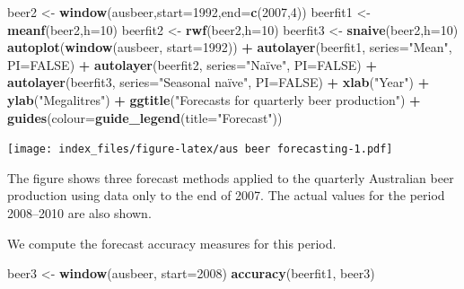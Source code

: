 \documentclass[
]{article}
\newenvironment{Shaded}{\begin{snugshade}}{\end{snugshade}}
\newcommand{\DataTypeTok}[1]{\textcolor[rgb]{0.13,0.29,0.53}{#1}}
\newcommand{\DecValTok}[1]{\textcolor[rgb]{0.00,0.00,0.81}{#1}}
\newcommand{\KeywordTok}[1]{\textcolor[rgb]{0.13,0.29,0.53}{\textbf{#1}}}
\newcommand{\NormalTok}[1]{#1}
\newcommand{\OperatorTok}[1]{\textcolor[rgb]{0.81,0.36,0.00}{\textbf{#1}}}
\newcommand{\OtherTok}[1]{\textcolor[rgb]{0.56,0.35,0.01}{#1}}
\newcommand{\StringTok}[1]{\textcolor[rgb]{0.31,0.60,0.02}{#1}}
\begin{document}
\begin{Shaded}
\begin{Highlighting}[]
\NormalTok{beer2 <-}\StringTok{ }\KeywordTok{window}\NormalTok{(ausbeer,}\DataTypeTok{start=}\DecValTok{1992}\NormalTok{,}\DataTypeTok{end=}\KeywordTok{c}\NormalTok{(}\DecValTok{2007}\NormalTok{,}\DecValTok{4}\NormalTok{))}
\NormalTok{beerfit1 <-}\StringTok{ }\KeywordTok{meanf}\NormalTok{(beer2,}\DataTypeTok{h=}\DecValTok{10}\NormalTok{)}
\NormalTok{beerfit2 <-}\StringTok{ }\KeywordTok{rwf}\NormalTok{(beer2,}\DataTypeTok{h=}\DecValTok{10}\NormalTok{)}
\NormalTok{beerfit3 <-}\StringTok{ }\KeywordTok{snaive}\NormalTok{(beer2,}\DataTypeTok{h=}\DecValTok{10}\NormalTok{)}
\KeywordTok{autoplot}\NormalTok{(}\KeywordTok{window}\NormalTok{(ausbeer, }\DataTypeTok{start=}\DecValTok{1992}\NormalTok{)) }\OperatorTok{+}
\StringTok{  }\KeywordTok{autolayer}\NormalTok{(beerfit1, }\DataTypeTok{series=}\StringTok{"Mean"}\NormalTok{, }\DataTypeTok{PI=}\OtherTok{FALSE}\NormalTok{) }\OperatorTok{+}
\StringTok{  }\KeywordTok{autolayer}\NormalTok{(beerfit2, }\DataTypeTok{series=}\StringTok{"Naïve"}\NormalTok{, }\DataTypeTok{PI=}\OtherTok{FALSE}\NormalTok{) }\OperatorTok{+}
\StringTok{  }\KeywordTok{autolayer}\NormalTok{(beerfit3, }\DataTypeTok{series=}\StringTok{"Seasonal naïve"}\NormalTok{, }\DataTypeTok{PI=}\OtherTok{FALSE}\NormalTok{) }\OperatorTok{+}
\StringTok{  }\KeywordTok{xlab}\NormalTok{(}\StringTok{"Year"}\NormalTok{) }\OperatorTok{+}\StringTok{ }\KeywordTok{ylab}\NormalTok{(}\StringTok{"Megalitres"}\NormalTok{) }\OperatorTok{+}
\StringTok{  }\KeywordTok{ggtitle}\NormalTok{(}\StringTok{"Forecasts for quarterly beer production"}\NormalTok{) }\OperatorTok{+}
\StringTok{  }\KeywordTok{guides}\NormalTok{(}\DataTypeTok{colour=}\KeywordTok{guide_legend}\NormalTok{(}\DataTypeTok{title=}\StringTok{"Forecast"}\NormalTok{))}
\end{Highlighting}
\end{Shaded}

\texttt{[image: index\_files/figure-latex/aus beer forecasting-1.pdf]}

The figure shows three forecast methods applied to the quarterly
Australian beer production using data only to the end of 2007. The
actual values for the period 2008--2010 are also shown.

We compute the forecast accuracy measures for this period.

\begin{Shaded}
\begin{Highlighting}[]
\NormalTok{beer3 <-}\StringTok{ }\KeywordTok{window}\NormalTok{(ausbeer, }\DataTypeTok{start=}\DecValTok{2008}\NormalTok{)}
\KeywordTok{accuracy}\NormalTok{(beerfit1, beer3)}
\end{Highlighting}
\end{Shaded}
\end{document}
